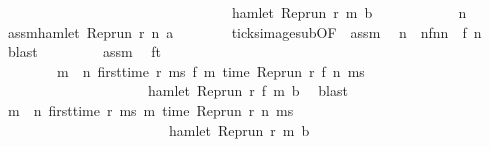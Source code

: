 \begin{isabellebody}
\ \ \ \ \ \ \ \ \ \ \ \ \ \ \ \ \ \ \ \ \ \ \ \ \ \ \ \ \ \ \ \ {\isasymlongrightarrow}\ hamlet\ {\isacharparenleft}{\isacharparenleft}Rep{\isacharunderscore}run\ r{\isacharparenright}\ m\ b{\isacharparenright}{\isacharparenright}{\isacartoucheclose}\isanewline
\ \ \isamarkupfalse%
\ {\isacharminus}\isanewline
\ \ \ \ \isacommand{{\isacharbraceleft}}\isamarkupfalse%
\ \isamarkupfalse%
\ n\ \isamarkupfalse%
\ assm{\isacharcolon}{\isacartoucheopen}hamlet\ {\isacharparenleft}{\isacharparenleft}Rep{\isacharunderscore}run\ r{\isacharparenright}\ n\ a{\isacharparenright}{\isacartoucheclose}\isanewline
\ \ \ \ \ \ \isamarkupfalse%
\ ticks{\isacharunderscore}image{\isacharunderscore}sub{\isacharbrackleft}OF\ {\isacharasterisk}\ assm{\isacharbrackright}\ \isamarkupfalse%
\ n\ \ nfn{}{\isacharcolon}{\isacartoucheopen}n\ {\isacharequal}\ f\ n\ \isamarkupfalse%
\ blast\isanewline
\ \ \ \ \ \ \isamarkupfalse%
\ {\isacharasterisk}{\isacharasterisk}\ assm\ \isamarkupfalse%
\ ft{}{\isacharcolon}\isanewline
\ \ \ \ \ \ \ \ {\isacartoucheopen}{\isacharparenleft}{\isasymforall}m\ {\isasymge}\ n\ first{\isacharunderscore}time\ r\ ms\ {\isacharparenleft}f\ m\ {\isacharparenleft}time\ {\isacharparenleft}{\isacharparenleft}Rep{\isacharunderscore}run\ r{\isacharparenright}\ {\isacharparenleft}f\ n\ ms{\isacharparenright}\ {\isacharplus}\ {\isasymdelta}{\isasymtau}{\isacharparenright}\isanewline
\ \ \ \ \ \ \ \ \ \ \ \ \ \ \ \ \ \ \ \ {\isasymlongrightarrow}\ hamlet\ {\isacharparenleft}{\isacharparenleft}Rep{\isacharunderscore}run\ r{\isacharparenright}\ {\isacharparenleft}f\ m\ b{\isacharparenright}{\isacharparenright}{\isacartoucheclose}\ \isamarkupfalse%
\ blast\isanewline
\ \ \ \ \ \ \isamarkupfalse%
\ {\isacartoucheopen}{\isacharparenleft}{\isasymforall}m\ {\isasymge}\ n{\isachardot}\ first{\isacharunderscore}time\ r\ ms\ m\ {\isacharparenleft}time\ {\isacharparenleft}{\isacharparenleft}Rep{\isacharunderscore}run\ r{\isacharparenright}\ n\ ms{\isacharparenright}\ {\isacharplus}\ {\isasymdelta}{\isasymtau}{\isacharparenright}\ \isanewline
\ \ \ \ \ \ \ \ \ \ \ \ \ \ \ \ \ \ \ \ \ \ \ {\isasymlongrightarrow}\ hamlet\ {\isacharparenleft}{\isacharparenleft}Rep{\isacharunderscore}run\ r{\isacharparenright}\ m\ b{\isacharparenright}{\isacharparenright}\ {\isacartoucheclose}\isanewline

\end{isabellebody}
